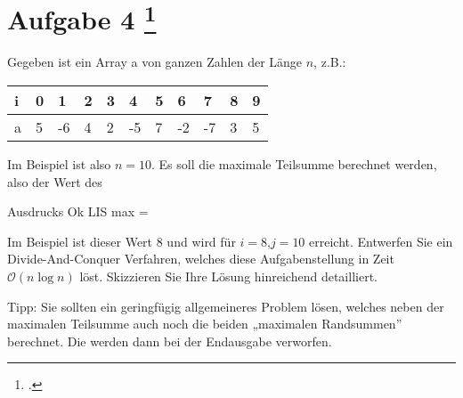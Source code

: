 \documentclass{lehramt-informatik-aufgabe}
\begin{document}
\section{Aufgabe 4
\footcite{66115:2012:09}}

Gegeben ist ein Array a von ganzen Zahlen der Länge $n$, z.B.:

\begin{center}
\begin{tabular}{l|llllllllll}
i & 0 & 1 & 2 & 3 & 4 & 5 & 6 & 7 & 8 & 9\\\hline

a & 5 & -6 & 4 & 2 & -5 & 7 & -2 & -7 & 3 & 5\\
\end{tabular}
\end{center}

Im Beispiel ist also $n = 10$. Es soll die maximale Teilsumme berechnet
werden, also der Wert des

Ausdrucks
Ok
LIS max =

Im Beispiel ist dieser Wert $8$ und wird für $i = 8$,$j = 10$ erreicht.
Entwerfen Sie ein Divide-And-Conquer Verfahren, welches diese
Aufgabenstellung in Zeit $\mathcal{O}(n \log n)$ löst. Skizzieren Sie
Ihre Lösung hinreichend detailliert.

Tipp: Sie sollten ein geringfügig allgemeineres Problem lösen, welches
neben der maximalen Teilsumme auch noch die beiden „maximalen
Randsummen” berechnet. Die werden dann bei der Endausgabe verworfen.

\end{document}
